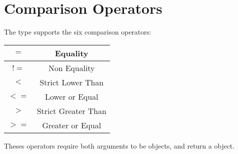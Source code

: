 \section{Comparison Operators}

The  type supports the six comparison operators:\newline

\begin{tabular}{|c|c|}
\hline
$=$ & Equality \\
\hline
$!=$ & Non Equality \\
\hline
$<$  & Strict Lower Than \\
\hline
$<=$  & Lower or Equal \\
\hline
$>$  & Strict Greater Than \\
\hline
$>=$  & Greater or Equal \\
\hline
\end{tabular}

Theses operators require both arguments to be  objects, and return a  object.



